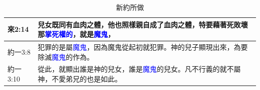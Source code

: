 \begin{table}[H]
\begin{tabular}{p{1.6cm}|p{}}
來2:14&兒女既同有血肉之體，他也照樣親自成了血肉之體，特要藉著死敗壞那\textcolor{blue}{掌死權的}，就是\textcolor{blue}{魔鬼}，\\\hline

約一3:8&犯罪的是屬\textcolor{blue}{魔鬼}，因為魔鬼從起初就犯罪。神的兒子顯現出來，為要除滅\textcolor{blue}{魔鬼}的作為。\\\hline

約一3:10&從此，就顯出誰是神的兒女，誰是\textcolor{blue}{魔鬼}的兒女。凡不行義的就不屬神，不愛弟兄的也是如此。\\\hline

\end{tabular}
\caption{新約所做}
\end{table}







